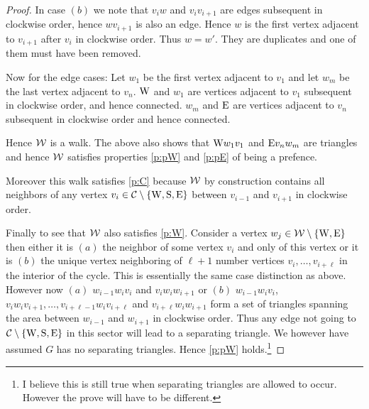 \begin{proof}
In case $(b)$ we note that $v_i w$ and $v_i v_{i+1}$ are edges subsequent in clockwise order, hence $wv_{i+1}$ is also an edge. Hence $w$ is the first vertex adjacent to $v_{i+1}$ after $v_i$ in clockwise order. Thus $w= w'$. They are duplicates and one of them must have been removed.

Now for the edge cases: Let $w_1$ be the first vertex adjacent to $v_1$ and let $w_m$ be the last vertex adjacent to $v_n$. $\mathrm{W}$ and $w_1$ are vertices adjacent to $v_1$ subsequent in clockwise order, and hence connected. $w_m$ and $\mathrm{E}$ are vertices adjacent to $v_n$ subsequent in clockwise order and hence connected.

Hence $\mathcal{W}$ is a walk. The above also shows that $\mathrm{W} w_1 v_1$ and $\mathrm{E} v_n w_m$ are triangles and hence $\mathcal{W}$ satisfies properties \ref{p:pW} and \ref{p:pE} of being a prefence.

Moreover this walk satisfies  \ref{p:C} because $\mathcal{W}$ by construction contains all neighbors of any vertex $v_i \in \mathcal{C} \setminus \left\lbrace {\mathrm{W}, \mathrm{S}, \mathrm{E}} \right\rbrace$ between $v_{i-1}$ and $v_{i+1}$ in clockwise order.

Finally to see that $\mathcal{W}$ also satisfies \ref{p:W}. Consider a vertex $w_j \in \mathcal{W} \setminus \left\lbrace {\mathrm{W}, \mathrm{E}} \right\rbrace$ then either it is $(a)$ the neighbor of some vertex $v_i$ and only of this vertex or it is $(b)$ the unique vertex neighboring of $\ell +1$ number vertices $v_i, \ldots, v_{i+\ell}$ in the interior of the cycle. This is essentially the same case distinction as above. However now $(a)$ $w_{i-1} w_i v_i$ and $v_i w_i w_{i+1}$ or $(b)$ $w_{i-1} w_i v_i$, $v_i w_i v_{i+1}, \ldots, v_{i+\ell -1} w_i v_{i+\ell} $
 and $v_{i+\ell} w_i w_{i+1}$ form a set of triangles spanning the area between $w_{i-1}$ and $w_{i+1}$ in clockwise order. Thus any edge not going to $\mathcal{C} \setminus \left\lbrace {\mathrm{W}, \mathrm{S}, \mathrm{E}} \right\rbrace$ in this sector will lead to a separating triangle. We however have assumed $G$ has no separating triangles. Hence \ref{p:pW} holds.\footnote{I believe this is still true when separating triangles are allowed to occur. However the prove will have to be different.}
\end{proof}






